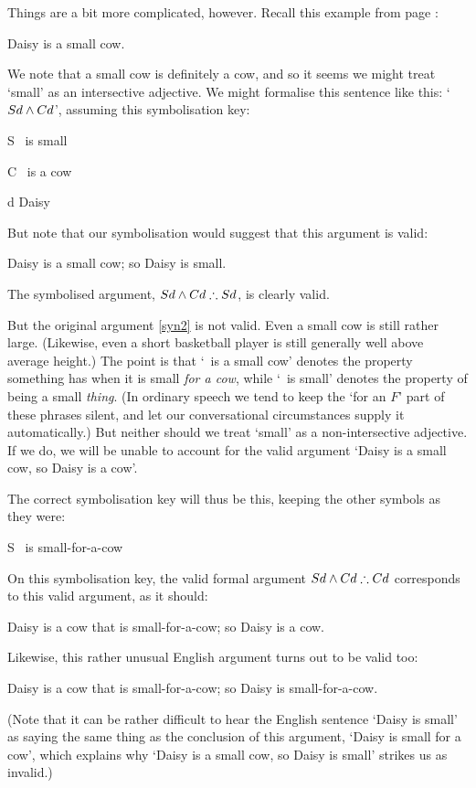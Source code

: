 Things are a bit more complicated, however. Recall this example from page \pageref{daisy}:
\begin{earg}
	\item[] Daisy is a small cow.
\end{earg} We note that a small cow is definitely a cow, and so it seems we might treat `small' as an intersective adjective. We might formalise this sentence like this: `$Sd \wedge Cd$', assuming this symbolisation key:
	\begin{ekey}
		\item[S] \blank\ is small
		\item[C] \blank\ is a cow
		\item[d] Daisy
	\end{ekey}
But note that our symbolisation would suggest that this argument is valid: \begin{earg}
	\item[\ex{syn2}] Daisy is a small cow; so Daisy is small.
\end{earg} The symbolised argument, $Sd \wedge Cd \mathrel{\therefore} Sd$, is clearly valid.

But the original argument \ref{syn2} is not valid. Even a small cow is still rather large. (Likewise, even a short basketball player is still generally well above average height.) The point is that `\blank\ is a small cow' denotes the property something has when it is small \emph{for a cow}, while `\blank\ is small' denotes the property of being a small \emph{thing}. (In ordinary speech we tend to keep the  `for an $F$' part of these phrases silent, and let our conversational circumstances supply it automatically.) But neither should we treat `small' as a non-intersective adjective. If we do, we will be unable to account for the valid argument `Daisy is a small cow, so Daisy is a cow'. 

The correct symbolisation key will thus be this, keeping the other symbols as they were: 
	\begin{ekey}
		\item[S] \blank\ is small-for-a-cow
	\end{ekey} On this symbolisation key, the valid formal argument $Sd \wedge Cd \mathrel{\therefore} Cd$ corresponds to this valid argument, as it should:
	\begin{earg}
		\item[] Daisy is a cow that is small-for-a-cow; so Daisy is a cow.
	\end{earg} 
Likewise, this rather unusual English argument turns out to be valid too: \begin{earg}
		\item[] Daisy is a cow that is small-for-a-cow; so Daisy is small-for-a-cow.
	\end{earg} (Note that it can be rather difficult to hear the English sentence `Daisy is small' as saying the same thing as the conclusion of this argument, `Daisy is small for a cow', which explains why `Daisy is a small cow, so Daisy is small' strikes us as invalid.)

